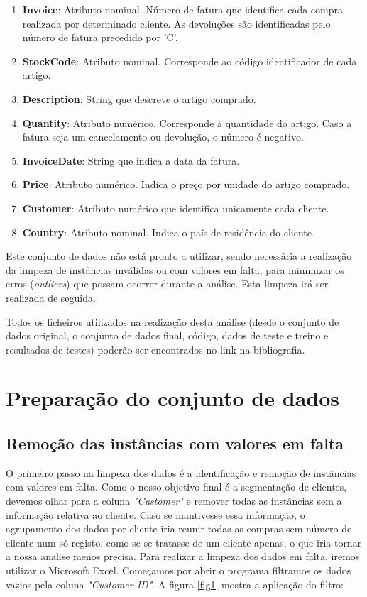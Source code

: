 \documentclass{easychair}
\begin{document}
\begin{enumerate}
    \item \textbf{Invoice}: Atributo nominal. Número de fatura que identifica cada compra realizada por determinado cliente. As devoluções são identificadas pelo número de fatura precedido por 'C'.
    \item \textbf{StockCode}: Atributo nominal. Corresponde ao código identificador de cada artigo.
    \item \textbf{Description}: String que descreve o artigo comprado.
    \item \textbf{Quantity}: Atributo numérico. Corresponde à quantidade do artigo. Caso a fatura seja um cancelamento ou devolução, o número é negativo.
    \item \textbf{InvoiceDate}: String que indica a data da fatura.
    \item \textbf{Price}: Atributo numérico. Indica o preço por unidade do artigo comprado.
    \item \textbf{Customer}: Atributo numérico que identifica unicamente cada cliente.
    \item \textbf{Country}: Atributo nominal. Indica o país de residência do cliente.
\end{enumerate}

Este conjunto de dados não está pronto a utilizar, sendo necessária a realização da limpeza de instâncias inválidas ou com valores em falta, para minimizar os erros (\textit{outliers}) que possam ocorrer durante a análise. Esta limpeza irá ser realizada de seguida.


Todos os ficheiros utilizados na realização desta análise (desde o conjunto de dados original, o conjunto de dados final, código, dados de teste e treino e resultados de testes) poderão ser encontrados no link na bibliografia\cite{ficheiros}.

\newpage

\section{Preparação do conjunto de dados}
\subsection{Remoção das instâncias com valores em falta}

O primeiro passo na limpeza dos dados é a identificação e remoção de instâncias com valores em falta. Como o nosso objetivo final é a segmentação de clientes, devemos olhar para a coluna \textit{"Customer"} e remover todas as instâncias sem a informação relativa ao cliente. Caso se mantivesse essa informação, o agrupamento dos dados por cliente iria reunir todas as compras sem número de cliente num só registo, como se se tratasse de um cliente apenas, o que iria tornar a nossa analise menos precisa.
Para realizar a limpeza dos dados em falta, iremos utilizar o Microsoft Excel. Começamos por abrir o programa filtramos os dados vazios pela coluna \textit{"Customer ID"}. A figura \ref{fig1} mostra a aplicação do filtro:
\end{document}
